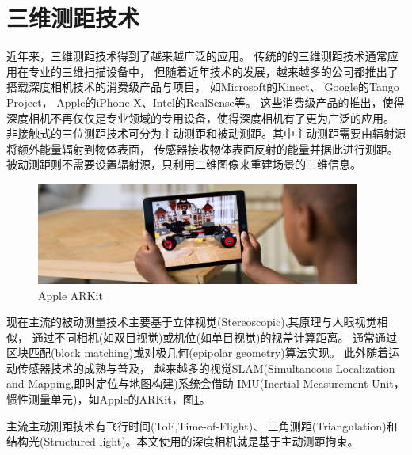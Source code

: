 \section{三维测距技术}\label{range_finding}
近年来，三维测距技术得到了越来越广泛的应用。
传统的的三维测距技术通常应用在专业的三维扫描设备中，
但随着近年技术的发展，越来越多的公司都推出了搭载深度相机技术的消费级产品与项目，
如Microsoft的Kinect\cite{microsoft_kinect}、
Google的Tango\cite{google_tango} Project，
Apple的iPhone X\cite{apple_iphoneX}、Intel的RealSense\cite{intel_realsense}等。
这些消费级产品的推出，使得深度相机不再仅仅是专业领域的专用设备，使得深度相机有了更为广泛的应用。
非接触式的三位测距技术可分为主动测距和被动测距。其中主动测距需要由辐射源将额外能量辐射到物体表面，
传感器接收物体表面反射的能量并据此进行测距。被动测距则不需要设置辐射源，只利用二维图像来重建场景的三维信息。
\begin{figure}[h]
    \centering
    \includegraphics[width=0.95\textwidth]{./Pictures/ARKit.eps}
    \caption{Apple ARKit}
    \label{arkit}
\end{figure}

现在主流的被动测量技术主要基于立体视觉(Stereoscopic),其原理与人眼视觉相似，
通过不同相机(如双目视觉)或机位(如单目视觉)的视差计算距离。
通常通过区块匹配(block matching)或对极几何(epipolar geometry)算法实现。
此外随着运动传感器技术的成熟与普及，
越来越多的视觉SLAM(Simultaneous Localization and Mapping,即时定位与地图构建)系统会借助
IMU(Inertial Measurement Unit，惯性测量单元)，如Apple的ARKit\cite{apple_arkit}，图\ref{arkit}。

主流主动测距技术有飞行时间(ToF,Time-of-Flight)、
三角测距(Triangulation)和结构光(Structured light)。本文使用的深度相机就是基于主动测距拘束。
